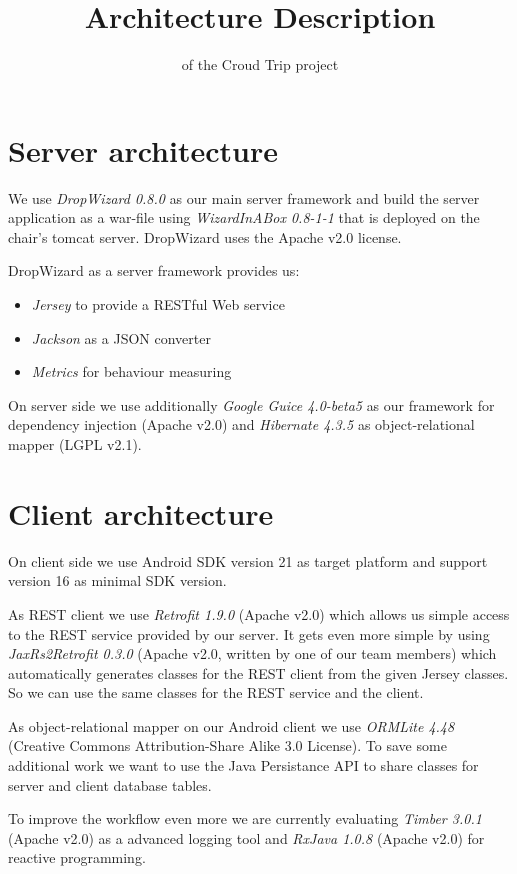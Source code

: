 \documentclass[ngerman, 10pt, a4paper]{scrartcl}
\title{ Architecture Description\huge \vspace{1pt} }
\author{ of the Croud Trip project\\ }
\makeatletter
\def\printtitle{ {\color{bl} \centering \huge \sc \textbf{\@title}\par}}
\def\printauthor{{\color{bl} \centering \small \@author}}
\makeatother
\begin{document}
\clearpage
\printtitle
\printauthor 

\section{Server architecture}
We use \emph{DropWizard 0.8.0} \cite{DropWizard} as our main server framework and build the server application as a war-file using \emph{WizardInABox 0.8-1-1} \cite{WizardInABox}  that is deployed on the chair's tomcat server. DropWizard uses the Apache v2.0 license.

DropWizard as a server framework provides us:
\begin{itemize}
\setlength\itemsep{0em}
\item \emph{Jersey} to provide a RESTful Web service
\item \emph{Jackson} as a JSON converter
\item \emph{Metrics} for behaviour measuring
\end{itemize} 
On server side we use additionally \emph{Google Guice 4.0-beta5} \cite{GGuice} as our framework for dependency injection (Apache v2.0) and \emph{Hibernate 4.3.5} \cite{Hibernate} as object-relational mapper (LGPL v2.1).

\section{Client architecture}
On client side we use Android SDK version 21 as target platform and support version 16 as minimal SDK version.

As REST client we use \emph{Retrofit 1.9.0} \cite{Retrofit} (Apache v2.0) which allows us simple access to the REST service provided by our server. It gets even more simple by using \emph{JaxRs2Retrofit 0.3.0} \cite{JRR} (Apache v2.0, written by one of our team members) which automatically generates classes for the REST client from the given Jersey classes. So we can use the same classes for the REST service and the client.

As object-relational mapper on our Android client we use \emph{ORMLite 4.48} \cite{ORMLite} (Creative Commons Attribution-Share Alike 3.0 License). To save some additional work we want to use the Java Persistance API to share classes for server and client database tables.

To improve the workflow even more we are currently evaluating \emph{Timber 3.0.1} \cite{Timber} (Apache v2.0) as a advanced logging tool and \emph{RxJava 1.0.8} \cite{RxJava} (Apache v2.0) for reactive programming.
\end{document}
